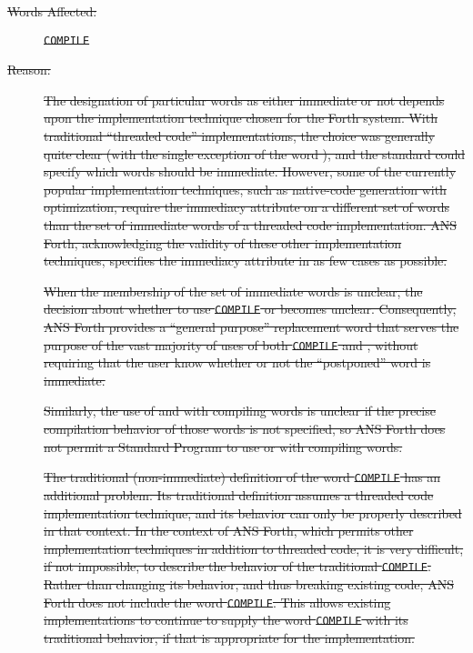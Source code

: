 \begin{description}
\item[\sout{Words Affected:}]
\sout{%
	\texttt{COMPILE}	\word{[COMPILE]}
	\word{[']}			}

\item[\sout{Reason:}]
\sout{%
	The designation of particular words as either immediate or not
	depends upon the implementation technique chosen for the Forth
	system. With traditional ``threaded code'' implementations, the
	choice was generally quite clear (with the single exception of
	the word ), and the standard could specify which words
	should be immediate. However, some of the currently popular
	implementation techniques, such as native-code generation with
	optimization, require the immediacy attribute on a different set
	of words than the set of immediate words of a threaded code
	implementation. ANS Forth, acknowledging the validity of these
	other implementation techniques, specifies the immediacy attribute
	in as few cases as possible.}

\sout{%
	When the membership of the set of immediate words is unclear, the
	decision about whether to use \texttt{COMPILE} or \word{[COMPILE]}
	becomes unclear. Consequently, ANS Forth provides a ``general
	purpose'' replacement word  that serves the purpose
	of the vast majority of uses of both \texttt{COMPILE} and
	\word{[COMPILE]}, without requiring that the user know whether or
	not the ``postponed'' word is immediate.}

\sout{%
	Similarly, the use of  and \word{[']} with compiling words
	is unclear if the precise compilation behavior of those words is
	not specified, so ANS Forth does not permit a Standard Program to
	use  or \word{[']} with compiling words.}

\sout{%
	The traditional (non-immediate) definition of the word \texttt{COMPILE}
	has an additional problem. Its traditional definition assumes a
	threaded code implementation technique, and its behavior can only
	be properly described in that context. In the context of ANS Forth,
	which permits other implementation techniques in addition to
	threaded code, it is very difficult, if not impossible, to describe
	the behavior of the traditional \texttt{COMPILE}. Rather than changing
	its behavior, and thus breaking existing code, ANS Forth does not
	include the word \texttt{COMPILE}. This allows existing implementations
	to continue to supply the word \texttt{COMPILE} with its traditional
	behavior, if that is appropriate for the implementation.}


\end{description}
